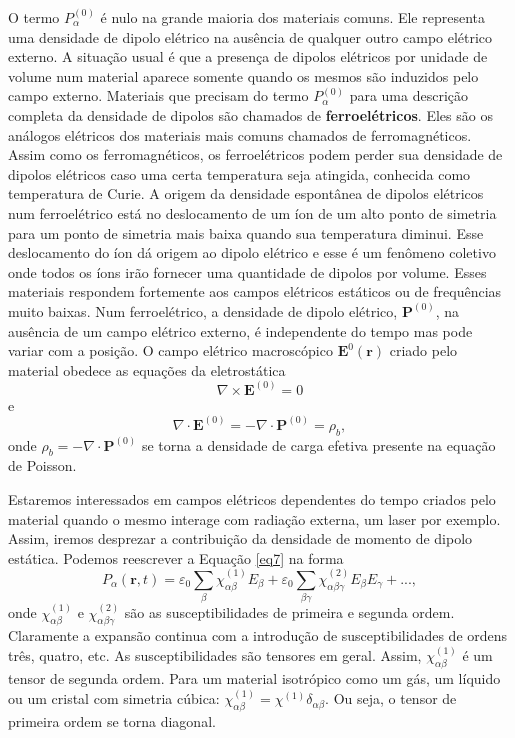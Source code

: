 \documentclass{article}
\begin{document}
O termo $P_\alpha^{(0)}$ é nulo na grande maioria dos materiais comuns. Ele representa uma densidade de dipolo elétrico na ausência de qualquer outro campo elétrico externo. A situação usual é que a presença de dipolos elétricos por unidade de volume num material aparece somente quando os mesmos são induzidos pelo campo externo. Materiais que precisam do termo $P_\alpha^{(0)}$ para uma descrição completa da densidade de dipolos são chamados de \textbf{ferroelétricos}. Eles são os análogos elétricos dos materiais mais comuns chamados de ferromagnéticos. Assim como os ferromagnéticos, os ferroelétricos podem perder sua densidade de dipolos elétricos caso uma certa temperatura seja atingida, conhecida como temperatura de Curie. A origem da densidade espontânea de dipolos elétricos num ferroelétrico está no deslocamento de um íon de um alto ponto de simetria para um ponto de simetria mais baixa quando sua temperatura diminui. Esse deslocamento do íon dá origem ao dipolo elétrico e esse é um fenômeno coletivo onde todos os íons irão fornecer uma quantidade de dipolos por volume. Esses materiais respondem fortemente aos campos elétricos estáticos ou de frequências muito baixas. Num ferroelétrico, a densidade de dipolo elétrico, $\mathbf{P}^{(0)}$, na ausência de um campo elétrico externo, é independente do tempo mas pode variar com a posição. O campo elétrico macroscópico $\mathbf{E}^{0}(\mathbf{r})$ criado pelo material obedece as equações da eletrostática
\begin{equation}
    \nabla\times\mathbf{E}^{(0)} = 0
\end{equation}
e
\begin{equation}
    \nabla\cdot\mathbf{E}^{(0)} = -\nabla\cdot\mathbf{P}^{(0)} = \rho_b,
\end{equation}
onde $\rho_b = -\nabla\cdot\mathbf{P}^{(0)}$ se torna a densidade de carga efetiva presente na equação de Poisson.

Estaremos interessados em campos elétricos dependentes do tempo criados pelo material quando o mesmo interage com radiação externa, um laser por exemplo. Assim, iremos desprezar a contribuição da densidade de momento de dipolo estática. Podemos reescrever a Equação \eqref{eq7} na forma
\begin{equation}
    P_\alpha (\mathbf{r},t) = \varepsilon_0\sum_{\beta} \chi^{(1)}_{\alpha\beta} E_\beta + \varepsilon_0\sum_{\beta\gamma}\chi^{(2)}_{\alpha\beta\gamma} E_\beta E_\gamma + ...,
\end{equation}
onde $\chi^{(1)}_{\alpha\beta}$ e $\chi^{(2)}_{\alpha\beta\gamma}$ são as susceptibilidades de primeira e segunda ordem. Claramente a expansão continua com a introdução de susceptibilidades de ordens três, quatro, etc. As susceptibilidades são tensores em geral. Assim, $\chi^{(1)}_{\alpha\beta}$ é um tensor de segunda ordem. Para um material isotrópico como um gás, um líquido ou um cristal com simetria cúbica: $\chi^{(1)}_{\alpha\beta} = \chi^{(1)} \delta_{\alpha\beta}$. Ou seja, o tensor de primeira ordem se torna diagonal.
\end{document}

